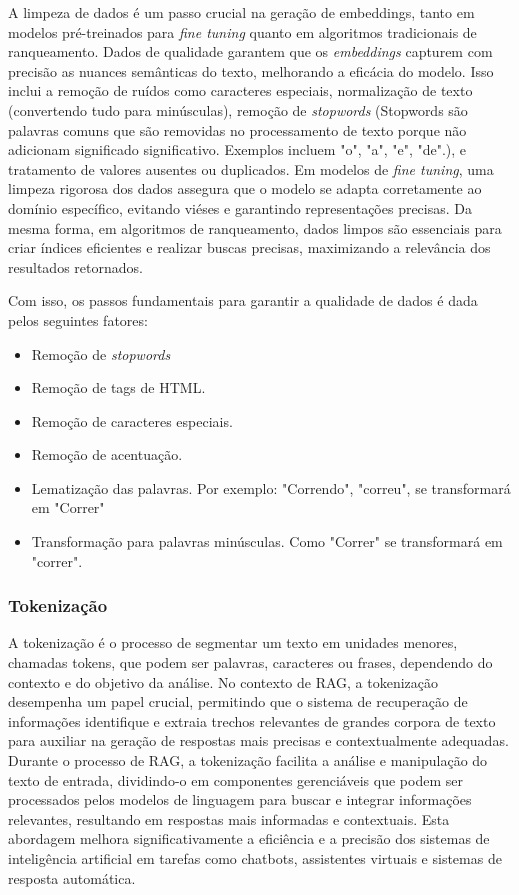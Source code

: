 A limpeza de dados é um passo crucial na geração de embeddings, tanto em modelos pré-treinados para \textit{fine tuning} quanto em algoritmos tradicionais de ranqueamento. Dados de qualidade garantem que os \textit{embeddings} capturem com precisão as nuances semânticas do texto, melhorando a eficácia do modelo. Isso inclui a remoção de ruídos como caracteres especiais, normalização de texto (convertendo tudo para minúsculas), remoção de \textit{stopwords} (Stopwords são palavras comuns que são removidas no processamento de texto porque não adicionam significado significativo. Exemplos incluem "o", "a", "e", "de".), e tratamento de valores ausentes ou duplicados. Em modelos de \textit{fine tuning}, uma limpeza rigorosa dos dados assegura que o modelo se adapta corretamente ao domínio específico, evitando viéses e garantindo representações precisas. Da mesma forma, em algoritmos de ranqueamento, dados limpos são essenciais para criar índices eficientes e realizar buscas precisas, maximizando a relevância dos resultados retornados.

Com isso, os passos fundamentais para garantir a qualidade de dados é dada pelos seguintes fatores:
\begin{itemize}
    \item Remoção de \textit{stopwords}
    \item Remoção de tags de HTML.
    \item Remoção de caracteres especiais. 
    \item Remoção de acentuação.
    \item Lematização das palavras. Por exemplo: "Correndo", "correu", se transformará em "Correr"
    \item Transformação para palavras minúsculas. Como "Correr" se transformará em "correr".
\end{itemize}



\subsubsection{Tokenização}

A tokenização é o processo de segmentar um texto em unidades menores, chamadas tokens, que podem ser palavras, caracteres ou frases, dependendo do contexto e do objetivo da análise. No contexto de RAG, a tokenização desempenha um papel crucial, permitindo que o sistema de recuperação de informações identifique e extraia trechos relevantes de grandes corpora de texto para auxiliar na geração de respostas mais precisas e contextualmente adequadas. Durante o processo de RAG, a tokenização facilita a análise e manipulação do texto de entrada, dividindo-o em componentes gerenciáveis que podem ser processados pelos modelos de linguagem para buscar e integrar informações relevantes, resultando em respostas mais informadas e contextuais. Esta abordagem melhora significativamente a eficiência e a precisão dos sistemas de inteligência artificial em tarefas como chatbots, assistentes virtuais e sistemas de resposta automática.

